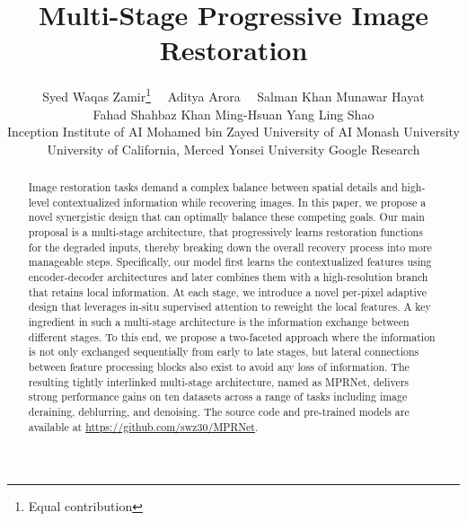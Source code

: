 \documentclass[10pt,twocolumn,letterpaper]{article}
\begin{document}
\title{\vspace{-0.0em}Multi-Stage Progressive Image Restoration}

\author{
Syed Waqas Zamir\thanks{Equal contribution }~~ \quad Aditya Arora\footnotemark[1]~~  \quad Salman Khan \quad Munawar Hayat \\ 
Fahad Shahbaz Khan  \quad Ming-Hsuan Yang \quad Ling Shao \\
Inception Institute of AI \quad Mohamed bin Zayed University of AI \quad
Monash University\\
University of California, Merced \quad Yonsei University \quad Google Research 
\vspace{-0.5em}
}

\maketitle
 
\thispagestyle{empty}
\ifcvprfinal\pagestyle{empty}\fi

\begin{abstract}\vspace{-0.85em}
Image restoration tasks demand a complex balance between spatial details and high-level contextualized information while recovering images. 
In this paper, we propose a novel synergistic design that can optimally balance these competing goals. Our main proposal is a multi-stage architecture, that progressively learns restoration functions for the degraded inputs, thereby breaking down the overall recovery process into more manageable steps. Specifically, our model first learns the contextualized features using encoder-decoder architectures and later combines them with a high-resolution branch that retains local information. At each stage, we introduce a novel per-pixel adaptive design that leverages in-situ supervised attention to reweight the local features. A key ingredient in such a multi-stage architecture is the information exchange between different stages. To this end, we propose a two-faceted approach where the information is not only exchanged sequentially from early to late stages, but lateral connections between feature processing blocks also exist to avoid any loss of information. The resulting tightly interlinked multi-stage architecture, named as MPRNet, delivers strong performance gains on ten datasets across a range of tasks including image deraining, deblurring, and denoising. The source code and pre-trained models are available at \url{https://github.com/swz30/MPRNet}.  
\end{abstract}
\vspace{-0.3cm}
\end{document}
